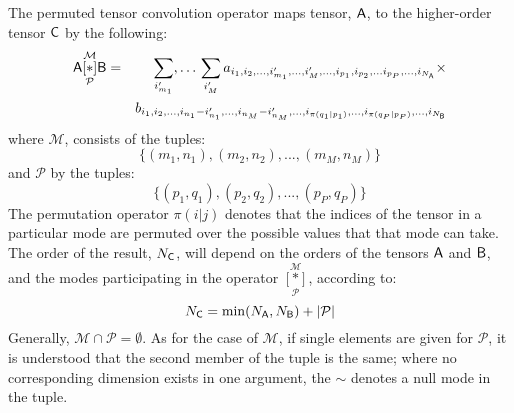 The permuted tensor convolution operator maps tensor, $\mathsf{A}$, to the higher-order tensor $\mathsf{C}$ by the following:
\begin{eqnarray}
\mathsf{A} \underset{\mathcal{P}}{\overset{\mathcal{M}}{[ \ast ]}} {\mathsf{B}} &=& \sum_{i'_{m_1}},\ldots\,\sum_{i_{M}'}   a_{i_1,i_2,...,i_{m_1}',...,i_{M}',...,i_{p_1},i_{p_2},...i_{p_P},...,i_{N_{\mathsf{A}}}} \times \nonumber \\
& &b_{i_1,i_2,...,i_{n_1}-i_{n_1}',...,i_{n_M}-i_{n_M}',...,i_{\pi(q_1|p_1)},...,i_{\pi(q_P|p_P)},...,i_{N_{\mathsf{B}}}}
\label{eq:t2}
\end{eqnarray}
where $\mathcal{M}$, consists of the tuples:
\[
\lbrace(m_1,n_1),(m_2,n_2),...,(m_{M},n_{M})\rbrace
\]
and $\mathcal{P}$ by the tuples:
\[
\lbrace(p_1,q_1),(p_2,q_2),...,(p_{P},q_{P})\rbrace
\]
The permutation operator $\pi(i|j)$ denotes that the indices of the tensor in a particular mode are permuted over the possible values that that mode can take.  The order of the result, $N_{\mathsf{C}}$, will depend on the orders of the tensors $\mathsf{A}$ and $\mathsf{B}$, and the modes participating in the operator $\underset{\mathcal{P}}{\overset{\mathcal{M}}{[ \ast ]}}$, according to:
\[
N_{\mathsf{C}} = \min(N_{\mathsf{A}},N_{\mathsf{B}}) +  |\mathcal{P}|
\]
Generally, $\mathcal{M}\cap\mathcal{P}=\emptyset$.  As for the case of $\mathcal{M}$, if single elements are given for $\mathcal{P}$, it is understood that the second member of the tuple is the same; where no corresponding dimension exists in one argument, the $\sim$ denotes a null mode in the tuple.\\

